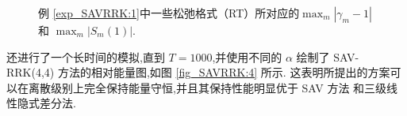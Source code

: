 \begin{figure}[H]
	\begin{center}
	\caption{例 \ref{exp_SAVRRK:1}中一些松弛格式（RT）所对应的$\max_m\left|\gamma_m-1\right|$ 和 $\max_m\left|S_m(1)\right|$.}
	\label{fig_SAVRRK:1}
	\end{center}
	\end{figure}
	还进行了一个长时间的模拟,直到 $T=1000$,并使用不同的 $\alpha$ 绘制了 SAV-RRK(4,4) 方法的相对能量图,如图 \ref{fig_SAVRRK:4} 所示.
	这表明所提出的方案可以在离散级别上完全保持能量守恒,并且其保持性能明显优于 SAV 方法\cite{chengConvergenceEnergyconservingScheme2022} 和三级线性隐式差分法\cite{wangConservativeLinearizedDifference2015}.		

